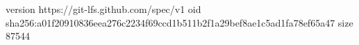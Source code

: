 version https://git-lfs.github.com/spec/v1
oid sha256:a01f20910836eea276c2234f69ccd1b511b2f1a29bef8ae1c5ad1fa78ef65a47
size 87544
